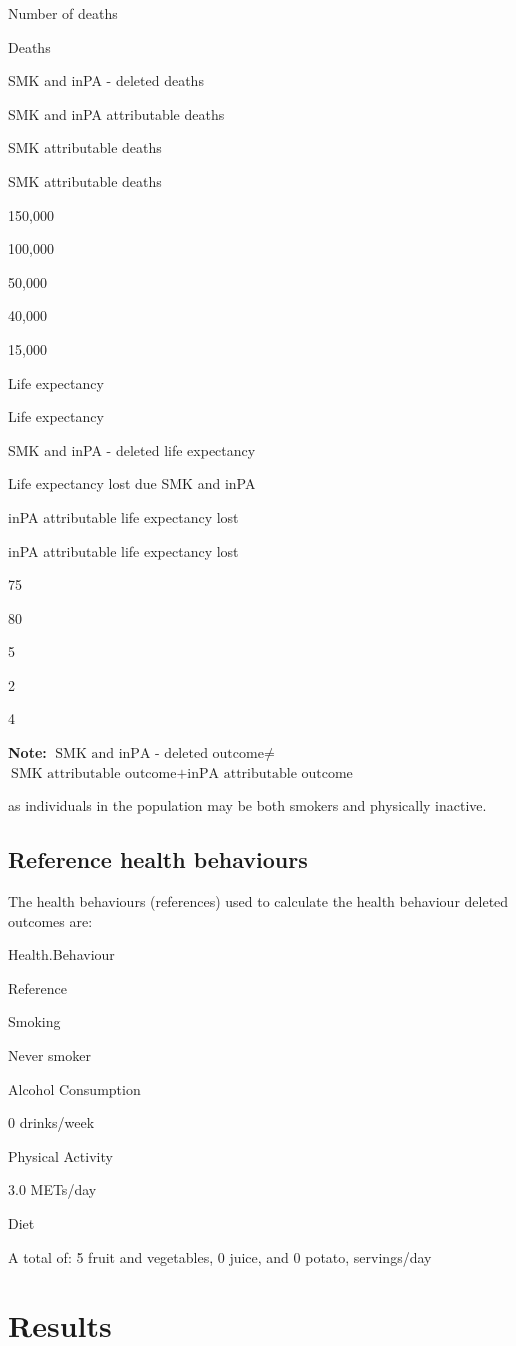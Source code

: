 \documentclass[]{book}
\begin{document}
Number of deaths

Deaths

SMK and inPA - deleted deaths

SMK and inPA attributable deaths

SMK attributable deaths

SMK attributable deaths

150,000

100,000

50,000

40,000

15,000

Life expectancy

Life expectancy

SMK and inPA - deleted life expectancy

Life expectancy lost due SMK and inPA

inPA attributable life expectancy lost

inPA attributable life expectancy lost

75

80

5

2

4

\textbf{Note:} \(\text{SMK and inPA - deleted outcome} \neq\)
\(\text{SMK attributable outcome} + \text{inPA attributable outcome}\)

as individuals in the population may be both smokers and physically
inactive.

\subsection{Reference health
behaviours}\label{reference-health-behaviours}

The health behaviours (references) used to calculate the health
behaviour deleted outcomes are:

Health.Behaviour

Reference

Smoking

Never smoker

Alcohol Consumption

0 drinks/week

Physical Activity

3.0 METs/day

Diet

A total of: 5 fruit and vegetables, 0 juice, and 0 potato, servings/day

\section{Results}\label{results}
\end{document}
